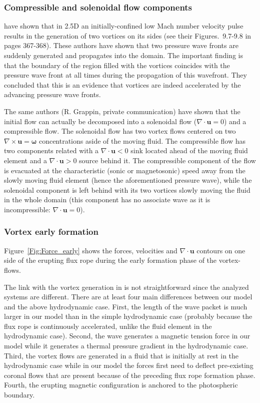 \documentclass[apj]{emulateapj}
\begin{document}
\subsubsection{Compressible and solenoidal flow components}
               
\cite{Belmont2013} have shown that in 2.5D an initially-confined low Mach number velocity pulse results in the generation of two vortices on its sides (see their Figures.~9.7-9.8 in pages 367-368). These authors have shown that two pressure wave fronts are suddenly generated and propagates into the domain. The important finding  is that the boundary of the region filled with the vortices coincides with the pressure wave front at all times during the propagation of this wavefront. They concluded that this is an evidence that vortices are indeed accelerated by the advancing pressure wave fronts. 
 
The same authors (R. Grappin, private communication) have shown that the initial flow can actually be decomposed into a solenoidal flow ($\nabla \cdot \mathbf{u} =0$) and a compressible flow. The solenoidal flow has
two vortex flows centered on two $\nabla \times \mathbf{u} = \boldsymbol{\omega}$ concentrations aside of the moving fluid.  The compressible flow has two components related with a $\nabla \cdot \mathbf{u} <0$ sink located ahead of the moving fluid element and a $\nabla \cdot \mathbf{u} >0$ source behind it. The compressible component of the flow is evacuated at the characteristic (sonic or magnetosonic) speed away from the slowly moving fluid element (hence the aforementioned pressure wave), while the solenoidal component is left behind with its two vortices slowly moving the fluid in the whole domain (this component has no associate wave as it is incompressible: $\nabla \cdot \mathbf{u} =0$).
   

\subsubsection{Vortex early formation}
 \label{Vortex-early}

Figure~\ref{Fig:Force_early} shows the forces, velocities and $\nabla \cdot \mathbf{u}$ contours on one side of the erupting flux rope during the early formation phase of the vortex-flows. 

The link with the vortex generation in \cite{Belmont2013} is not straightforward since the analyzed systems are different. There are at least four main differences between our model and the above hydrodynamic case.   
 First, the length of the wave packet is much larger in our model than in the simple hydrodynamic case (probably because the flux rope is continuously accelerated, unlike the fluid element in the hydrodynamic case).
 Second, the wave generates a magnetic tension force in our model while it generates a thermal pressure gradient in the hydrodynamic case. 
 Third, the vortex flows are generated in a fluid that is initially at rest in the hydrodynamic case while in our model the forces first need to deflect pre-existing coronal flows that are present because of  the preceding flux rope formation phase. 
 Fourth, the erupting magnetic configuration is anchored to the photospheric boundary.
\end{document}
